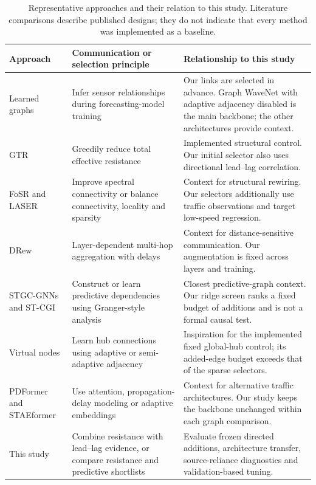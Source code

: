 \begin{table}[!t]
\centering
\caption{Representative approaches and their relation to this study. Literature comparisons describe published designs; they do not indicate that every method was implemented as a baseline.}
\label{tab:literature_position}
\footnotesize
\setlength{\tabcolsep}{4pt}
\begin{tabular}{@{}p{3.1cm}p{5.0cm}p{8.0cm}@{}}
\toprule
Approach & Communication or selection principle & Relationship to this study \\
\midrule
Learned graphs \cite{wu2019graphwavenet,wu2020mtgnn,shang2021gts,bai2020agcrn} & Infer sensor relationships during forecasting-model training & Our links are selected in advance. Graph WaveNet with adaptive adjacency disabled is the main backbone; the other architectures provide context. \\
GTR \cite{black2023resistance} & Greedily reduce total effective resistance & Implemented structural control. Our initial selector also uses directional lead--lag correlation. \\
FoSR and LASER \cite{karhadkar2023fosr,barbero2024laser} & Improve spectral connectivity or balance connectivity, locality and sparsity & Context for structural rewiring. Our selectors additionally use traffic observations and target low-speed regression. \\
DRew \cite{gutteridge2023drew} & Layer-dependent multi-hop aggregation with delays & Context for distance-sensitive communication. Our augmentation is fixed across layers and training. \\
STGC-GNNs and ST-CGI \cite{he2022stgc,zhang2022stcgi} & Construct or learn predictive dependencies using Granger-style analysis & Closest predictive-graph context. Our ridge screen ranks a fixed budget of additions and is not a formal causal test. \\
Virtual nodes \cite{cao2025virtual} & Learn hub connections using adaptive or semi-adaptive adjacency & Inspiration for the implemented fixed global-hub control; its added-edge budget exceeds that of the sparse selectors. \\
PDFormer and STAEformer \cite{jiang2023pdformer,liu2023staeformer} & Use attention, propagation-delay modeling or adaptive embeddings & Context for alternative traffic architectures. Our study keeps the backbone unchanged within each graph comparison. \\
This study & Combine resistance with lead--lag evidence, or compare resistance and predictive shortlists & Evaluate frozen directed additions, architecture transfer, source-reliance diagnostics and validation-based tuning. \\
\bottomrule
\end{tabular}
\end{table}
